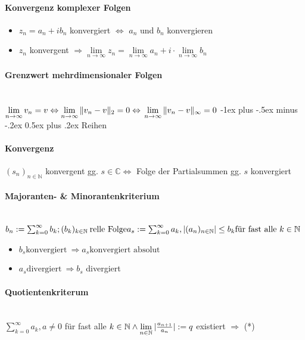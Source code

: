 \documentclass[paper=a3,paper=landscape, fontsize=9pt,DIV=25]{scrartcl}
\makeatletter
\newcommand{\compl}{\mathbb{C}}
\newcommand{\nat}{\mathbb{N}}
\newcommand{\aseq}{(a_n)_{n \in \nat}}
\newcommand{\srow}{(s_n)_{n \in \nat}}
\renewcommand{\section}{\@startsection{section}{1}{0mm}%
                                {-1ex plus -.5ex minus -.2ex}%
                                {0.5ex plus .2ex}%
                                {\normalfont\large\bfseries}}
\makeatother
\begin{document}
\begin{multicols*}{4}
		\paragraph{Konvergenz komplexer Folgen}
		\begin{itemize}
			\item $z_n = a_n + ib_n$ konvergiert $\Leftrightarrow$ $a_n$ und $b_n$ konvergieren
			\item $z_n$ konvergent $\Rightarrow \lim\limits_{n \rightarrow \infty} z_n = \lim\limits_{n \rightarrow \infty} a_n + i \cdot \lim\limits_{n \rightarrow \infty} b_n$
		\end{itemize}
		\paragraph{Grenzwert mehrdimensionaler Folgen}\hspace{0pt} \\
		$\lim\limits_{n \rightarrow \infty} v_n = v \Leftrightarrow \lim\limits_{n \rightarrow \infty} \Arrowvert v_n - v\Arrowvert_2 = 0 \Leftrightarrow \\ \lim\limits_{n \rightarrow \infty} \Arrowvert v_n - v\Arrowvert_\infty = 0$
	\section{Reihen}
                \paragraph{Konvergenz}
                $\srow$ konvergent gg. $s \in \compl \Leftrightarrow$ Folge der Partialsummen gg. $s$ konvergiert
		\paragraph{Majoranten- \& Minorantenkriterium}\hspace{0pt} \\
                $ b_n := \sum_{k=0}^{\infty} b_k; (b_k)_{k \in \nat}\:\text{relle Folge}\\ a_s := \sum_{k=0}^{\infty} a_k, |\aseq| \leq b_k \text{für fast alle}\ k \in \nat$
		\begin{itemize}
			\item $b_s \text{konvergiert}\ \Rightarrow a_s \text{konvergiert absolut}$
			\item $a_s \text{divergiert}\ \Rightarrow b_s$ divergiert
		\end{itemize}
		\paragraph{Quotientenkriterum}\hspace{0pt} \\
		$ \sum_{k=0}^{\infty} a_k, a \neq 0$ für fast alle $k \in \nat \wedge \lim\limits_{n \in \nat} \arrowvert \frac{a_{n+1}}{a_n} \arrowvert := q$ existiert $\Rightarrow$ (*)

\end{multicols*}
\end{document}
